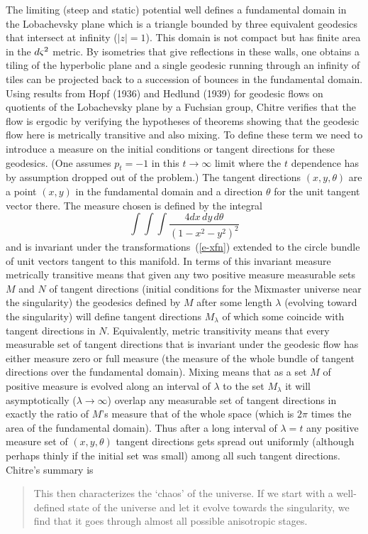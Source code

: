 The limiting (steep and static) potential well defines a fundamental
domain in the Lobachevsky plane which is a triangle bounded by three
equivalent geodesics that intersect at infinity ($|z| = 1$).  This
domain is not compact but has finite area in the $d\varsigma^2$ metric. By
isometries that give reflections in these walls, one obtains a tiling
of the hyperbolic plane and a single geodesic running through an
infinity of tiles can be projected back to a succession of bounces in
the fundamental domain. Using results from Hopf (1936) and Hedlund
(1939) for geodesic flows on quotients of the Lobachevsky plane by a
Fuchsian group, Chitre verifies that the flow is ergodic by verifying
the hypotheses of theorems showing that the geodesic flow here is
metrically transitive and also mixing.  To define these term we need
to introduce a measure on the initial conditions or tangent
directions for these geodesics.
(One assumes $p_t = -1$ in this $t \rightarrow
\infty$ limit where the $t$ dependence has by assumption dropped out
of the problem.)
The tangent directions $(x,y,\theta)$ are a point $(x,y)$
in the fundamental domain and a direction $\theta$ for the unit
tangent vector there.  The measure chosen is defined by the integral
\begin{equation}\label{e-measure}
  \int\int\int\frac{4dx\,dy\,d\theta}{(1-x^2-y^2)^2}
\end{equation}
and is invariant under the transformations~(\ref{e-xfn}) extended to
the circle bundle of unit vectors tangent to this manifold.  In terms
of this invariant measure metrically transitive means that given any
two positive measure measurable sets $M$ and $N$ of tangent
directions (initial conditions for the Mixmaster universe near the
singularity) the geodesics defined by $M$ after some length $\lambda$
(evolving toward the singularity) will define tangent directions
$M_\lambda$ of which some coincide with tangent directions in $N$.
Equivalently, metric transitivity means that every measurable set of
tangent directions that is invariant under the geodesic flow has
either measure zero or full measure (the measure of the whole bundle
of tangent directions over the fundamental domain).  Mixing means
that as a set $M$ of positive measure is evolved along an interval of
$\lambda$ to the set $M_\lambda$ it will asymptotically ($\lambda
\rightarrow \infty$) overlap any measurable set of tangent directions
in exactly the ratio of $M$'s measure that of the whole space (which
is $2\pi$ times the area of the fundamental domain).  Thus after a
long interval of $\lambda = t$ any positive measure set of
$(x,y,\theta)$ tangent directions gets spread out uniformly (although
perhaps thinly if the initial set was small) among all such tangent
directions.
Chitre's summary is
\begin{quote}
This then characterizes the `chaos' of the universe.  If we start
with a well-defined state of the universe and let it evolve towards
the singularity, we find that it goes through almost all possible
anisotropic stages.
\end{quote}


